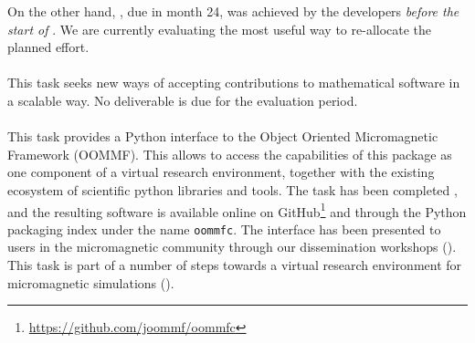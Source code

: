   On the other hand,
  , due in month
  24, was achieved by the \SMC developers \emph{before the start of
    \ODK}. We are currently evaluating the most useful way to
  re-allocate the planned effort.

  \paragraph{}
  This task seeks new ways of accepting contributions to mathematical
  software in a scalable way.  No deliverable is due for the
  evaluation period.

  \paragraph{}
  \label{component-architecture@oommf-python-interface}
  This task provides a Python interface to the Object Oriented
  Micromagnetic Framework (OOMMF). This allows to access the
  capabilities of this package as one component of a virtual research
  environment, together with the existing ecosystem of scientific
  python libraries and tools. The task has been completed \cite{Beg2017a}, and the
  resulting software is available online on
  GitHub\footnote{\url{https://github.com/joommf/oommfc}} and through
  the Python packaging index under the name \texttt{oommfc}. The
  interface has been presented to users in the micromagnetic community
  through our dissemination workshops
  (). This
  task is part of a number of steps towards a virtual research
  environment for micromagnetic simulations
  ().

